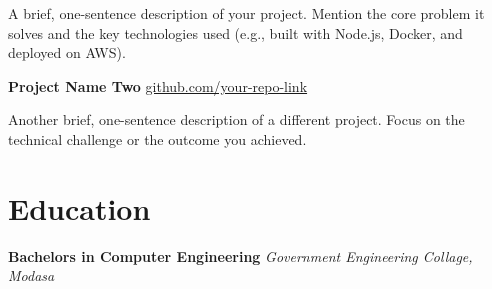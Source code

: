 A brief, one-sentence description of your project. Mention the core problem it solves and the key technologies used (e.g., built with Node.js, Docker, and deployed on AWS).

\vspace{1.5ex}

\textbf{Project Name Two} \hfill \href{https://github.com/your-repo-link}{github.com/your-repo-link}
\vspace{0.5ex}

Another brief, one-sentence description of a different project. Focus on the technical challenge or the outcome you achieved.

\section*{Education}
\textbf{Bachelors in Computer Engineering} \hfill \textit{Government Engineering Collage, Modasa}

